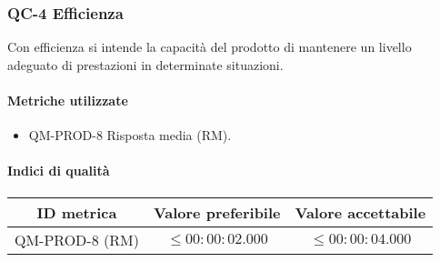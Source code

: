 \subsubsection{QC-4 Efficienza}
Con efficienza si intende la capacità del prodotto di mantenere un livello adeguato di prestazioni in determinate situazioni.
	
	\paragraph{Metriche utilizzate}
	\begin{itemize}
		\item QM-PROD-8 Risposta media (RM).
	\end{itemize}

	\paragraph{Indici di qualità}
	\begin{center}
		\begin{tabular}{|c|c|c|}
			\rowcolor{lighter-grayer}
			\hline
			\textbf{ID metrica} & \textbf{Valore preferibile} & \textbf{Valore accettabile} \\
			\hline
			QM-PROD-8 (RM) & \(\le 00:00:02.000\) & \(\le 00:00:04.000\) \\
			\hline
		\end{tabular}
	\end{center}
